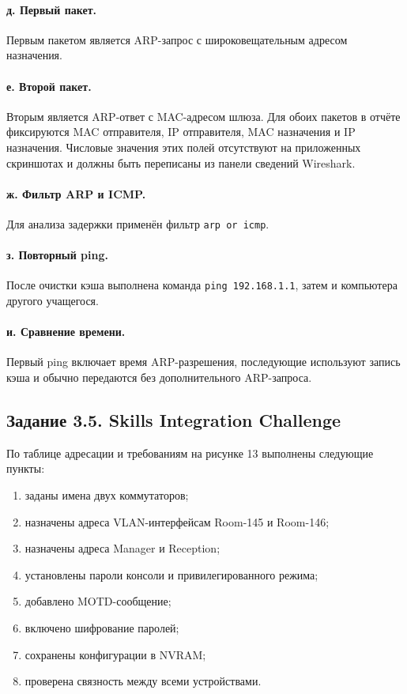 \documentclass[a4paper,14pt,oneside]{extarticle}
\begin{document}
\paragraph{д. Первый пакет.}
Первым пакетом является ARP-запрос с широковещательным адресом назначения.

\paragraph{е. Второй пакет.}
Вторым является ARP-ответ с MAC-адресом шлюза. Для обоих пакетов в отчёте
фиксируются MAC отправителя, IP отправителя, MAC назначения и IP назначения.
Числовые значения этих полей отсутствуют на приложенных скриншотах и должны
быть переписаны из панели сведений Wireshark.

\paragraph{ж. Фильтр ARP и ICMP.}
Для анализа задержки применён фильтр \texttt{arp or icmp}.

\paragraph{з. Повторный ping.}
После очистки кэша выполнена команда \texttt{ping 192.168.1.1}, затем
и компьютера другого учащегося.

\paragraph{и. Сравнение времени.}
Первый ping включает время ARP-разрешения, последующие используют запись
кэша и обычно передаются без дополнительного ARP-запроса.

\subsection{Задание 3.5. Skills Integration Challenge}

По таблице адресации и требованиям на рисунке 13 выполнены следующие пункты:
\begin{enumerate}[label=\arabic*.]
\item заданы имена двух коммутаторов;
\item назначены адреса VLAN-интерфейсам Room-145 и Room-146;
\item назначены адреса Manager и Reception;
\item установлены пароли консоли и привилегированного режима;
\item добавлено MOTD-сообщение;
\item включено шифрование паролей;
\item сохранены конфигурации в NVRAM;
\item проверена связность между всеми устройствами.
\end{enumerate}
\end{document}
